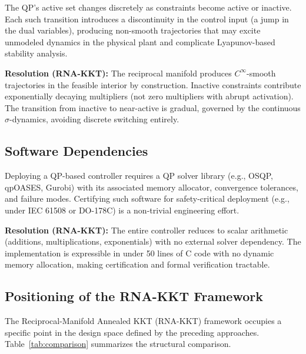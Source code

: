 \documentclass[11pt,onecolumn]{article}
\theoremstyle{definition}
\theoremstyle{remark}
\begin{document}
The QP's active set changes discretely as constraints become active or inactive. Each such transition introduces a discontinuity in the control input (a jump in the dual variables), producing non-smooth trajectories that may excite unmodeled dynamics in the physical plant and complicate Lyapunov-based stability analysis.

\textbf{Resolution (RNA-KKT):} The reciprocal manifold produces $C^\infty$-smooth trajectories in the feasible interior by construction. Inactive constraints contribute exponentially decaying multipliers (not zero multipliers with abrupt activation). The transition from inactive to near-active is gradual, governed by the continuous $\sigma$-dynamics, avoiding discrete switching entirely.

\subsection{Software Dependencies}

Deploying a QP-based controller requires a QP solver library (e.g., OSQP, qpOASES, Gurobi) with its associated memory allocator, convergence tolerances, and failure modes. Certifying such software for safety-critical deployment (e.g., under IEC 61508 or DO-178C) is a non-trivial engineering effort.

\textbf{Resolution (RNA-KKT):} The entire controller reduces to scalar arithmetic (additions, multiplications, exponentials) with no external solver dependency. The implementation is expressible in under 50 lines of C code with no dynamic memory allocation, making certification and formal verification tractable.

\subsection{Positioning of the RNA-KKT Framework}

The Reciprocal-Manifold Annealed KKT (RNA-KKT) framework occupies a specific point in the design space defined by the preceding approaches. Table~\ref{tab:comparison} summarizes the structural comparison.
\end{document}
